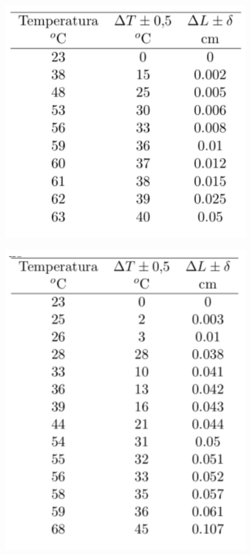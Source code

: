 \documentclass[DIV=calc, paper=a4, fontsize=11pt]{scrartcl}
\newenvironment{Figura}
  {\par\medskip\noindent\minipage{\linewidth}}
  {\endminipage\par\medskip}
\begin{document}
\begin{multicols}{2}
\begin{Figura}
\centering
    \includegraphics[width=0.8\textwidth]{tablas/tabla 4.PNG}
    \label{fig}
\end{Figura}

\begin{Figura}
\centering
    \includegraphics[width=0.8\textwidth]{tablas/tabla 5.PNG}
    \label{fig}
\end{Figura}


\end{multicols}
\end{document}
